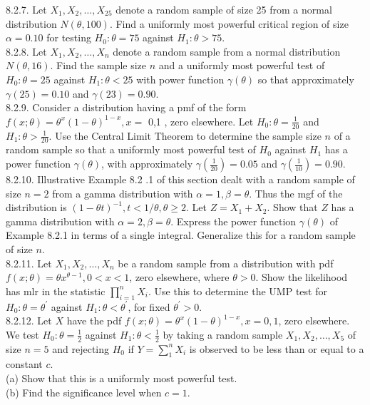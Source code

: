 8.2.7. Let $X_{1}, X_{2}, \ldots, X_{25}$ denote a random sample of size 25 from a normal distribution $N(\theta, 100)$. Find a uniformly most powerful critical region of size $\alpha=0.10$ for testing $H_{0}: \theta=75$ against $H_{1}: \theta>75$.\\
8.2.8. Let $X_{1}, X_{2}, \ldots, X_{n}$ denote a random sample from a normal distribution $N(\theta, 16)$. Find the sample size $n$ and a uniformly most powerful test of $H_{0}: \theta=25$ against $H_{1}: \theta<25$ with power function $\gamma(\theta)$ so that approximately $\gamma(25)=0.10$ and $\gamma(23)=0.90$.\\
8.2.9. Consider a distribution having a pmf of the form $f(x ; \theta)=\theta^{x}(1-\theta)^{1-x}, x=$ 0,1 , zero elsewhere. Let $H_{0}: \theta=\frac{1}{20}$ and $H_{1}: \theta>\frac{1}{20}$. Use the Central Limit Theorem to determine the sample size $n$ of a random sample so that a uniformly most powerful test of $H_{0}$ against $H_{1}$ has a power function $\gamma(\theta)$, with approximately $\gamma\left(\frac{1}{20}\right)=0.05$ and $\gamma\left(\frac{1}{10}\right)=0.90$.\\
8.2.10. Illustrative Example 8.2 .1 of this section dealt with a random sample of size $n=2$ from a gamma distribution with $\alpha=1, \beta=\theta$. Thus the mgf of the distribution is $(1-\theta t)^{-1}, t<1 / \theta, \theta \geq 2$. Let $Z=X_{1}+X_{2}$. Show that $Z$ has a gamma distribution with $\alpha=2, \beta=\theta$. Express the power function $\gamma(\theta)$ of Example 8.2.1 in terms of a single integral. Generalize this for a random sample of size $n$.\\
8.2.11. Let $X_{1}, X_{2}, \ldots, X_{n}$ be a random sample from a distribution with pdf $f(x ; \theta)=\theta x^{\theta-1}, 0<x<1$, zero elsewhere, where $\theta>0$. Show the likelihood has mlr in the statistic $\prod_{i=1}^{n} X_{i}$. Use this to determine the UMP test for $H_{0}: \theta=\theta^{\prime}$ against $H_{1}: \theta<\theta^{\prime}$, for fixed $\theta^{\prime}>0$.\\
8.2.12. Let $X$ have the pdf $f(x ; \theta)=\theta^{x}(1-\theta)^{1-x}, x=0,1$, zero elsewhere. We test $H_{0}: \theta=\frac{1}{2}$ against $H_{1}: \theta<\frac{1}{2}$ by taking a random sample $X_{1}, X_{2}, \ldots, X_{5}$ of size $n=5$ and rejecting $H_{0}$ if $Y=\sum_{1}^{n} X_{i}$ is observed to be less than or equal to a constant $c$.\\
(a) Show that this is a uniformly most powerful test.\\
(b) Find the significance level when $c=1$.\\
